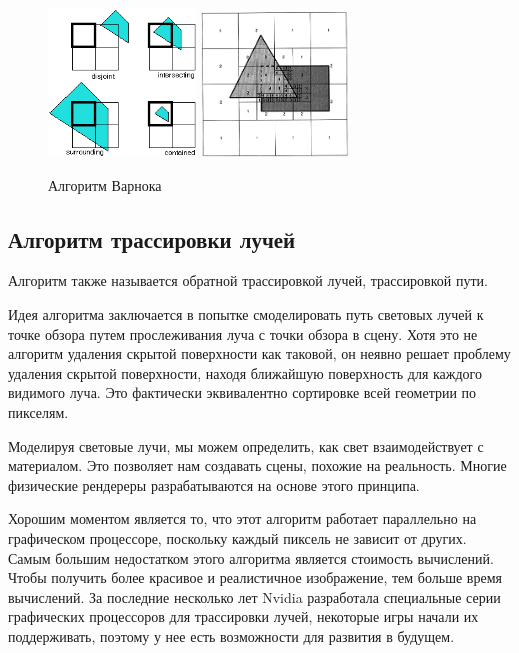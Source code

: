 \begin{figure}[ht]
  \centering
  \includegraphics[width=0.35\textwidth]{img/warnock_1.png}
  \hspace{1cm}
  \includegraphics[width=0.35\textwidth]{img/warnock_2.png}
  \caption{Алгоритм Варнока}
\end{figure}


\subsection*{Алгоритм трассировки лучей}


Алгоритм также называется обратной трассировкой лучей, трассировкой пути.

Идея алгоритма заключается в попытке смоделировать путь световых лучей к точке обзора путем прослеживания луча с точки обзора в сцену. Хотя это не алгоритм удаления скрытой поверхности как таковой, он неявно решает проблему удаления скрытой поверхности, находя ближайшую поверхность для каждого видимого луча. Это фактически эквивалентно сортировке всей геометрии по пикселям.

Моделируя световые лучи, мы можем определить, как свет взаимодействует с материалом. Это позволяет нам создавать сцены, похожие на реальность.
Многие физические рендереры разрабатываются на основе этого принципа.

Хорошим моментом является то, что этот алгоритм работает параллельно на графическом процессоре, поскольку каждый пиксель не зависит от других.
Самым большим недостатком этого алгоритма является стоимость вычислений. Чтобы получить более красивое и реалистичное изображение, тем больше время вычислений. За последние несколько лет Nvidia разработала специальные серии графических процессоров для трассировки лучей, некоторые игры начали их поддерживать, поэтому у нее есть возможности для развития в будущем.

